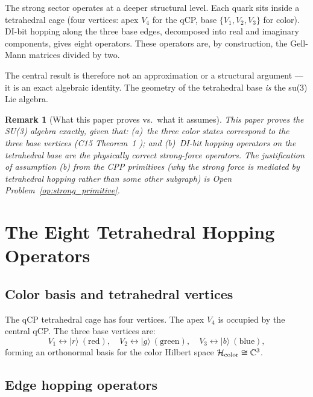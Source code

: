 \documentclass[11pt,a4paper]{article}
\newtheorem{remark}[theorem]{Remark}
\newcommand{\ket}[1]{|#1\rangle}
\begin{document}
The strong sector operates at a deeper structural level.  Each
quark sits inside a tetrahedral cage (four vertices: apex $V_4$
for the qCP, base $\{V_1, V_2, V_3\}$ for color).  DI-bit hopping
along the three base edges, decomposed into real and imaginary
components, gives eight operators.  These operators are, by
construction, the Gell-Mann matrices divided by two.

The central result is therefore not an approximation or a structural
argument --- it is an exact algebraic identity.  The geometry of the
tetrahedral base \emph{is} the su(3) Lie algebra.

\begin{remark}[What this paper proves vs.\ what it assumes]
This paper proves the SU(3) algebra exactly, given that:
(a)~the three color states correspond to the three base vertices
(C15 Theorem~1 \citep{c15}); and
(b)~DI-bit hopping operators on the tetrahedral base are the
physically correct strong-force operators.  The justification of
assumption (b) from the CPP primitives (why the strong force
is mediated by tetrahedral hopping rather than some other
subgraph) is Open Problem~\ref{op:strong_primitive}.
\end{remark}

\section{The Eight Tetrahedral Hopping Operators}

\subsection{Color basis and tetrahedral vertices}

The qCP tetrahedral cage has four vertices.  The apex $V_4$ is
occupied by the central qCP.  The three base vertices are:
\begin{equation}
V_1 \leftrightarrow \ket{r}\ (\text{red}),\quad
V_2 \leftrightarrow \ket{g}\ (\text{green}),\quad
V_3 \leftrightarrow \ket{b}\ (\text{blue}),
\label{eq:color_basis}
\end{equation}
forming an orthonormal basis for the color Hilbert space
$\mathcal{H}_{\rm color} \cong \mathbb{C}^3$.

\subsection{Edge hopping operators}
\end{document}

